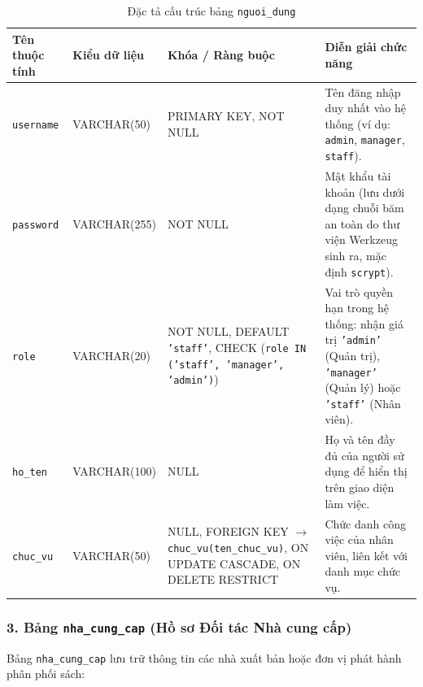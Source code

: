 \documentclass[12pt,a4paper]{article}
\begin{document}
\begin{table}[H]
\centering
\small
\renewcommand{\arraystretch}{1.2}
\begin{tabularx}{\textwidth}{|>{\raggedright\arraybackslash}p{3.0cm}|>{\raggedright\arraybackslash}p{2.6cm}|>{\raggedright\arraybackslash}p{3.8cm}|>{\raggedright\arraybackslash}X|}
\hline
\textbf{Tên thuộc tính} & \textbf{Kiểu dữ liệu} & \textbf{Khóa / Ràng buộc} & \textbf{Diễn giải chức năng} \\
\hline
\texttt{username} & VARCHAR(50) & PRIMARY KEY, NOT NULL & Tên đăng nhập duy nhất vào hệ thống (ví dụ: \texttt{admin}, \texttt{manager}, \texttt{staff}). \\
\hline
\texttt{password} & VARCHAR(255) & NOT NULL & Mật khẩu tài khoản (lưu dưới dạng chuỗi băm an toàn do thư viện Werkzeug sinh ra, mặc định \texttt{scrypt}). \\
\hline
\texttt{role} & VARCHAR(20) & NOT NULL, DEFAULT \texttt{'staff'}, CHECK (\texttt{role IN ('staff', 'manager', 'admin')}) & Vai trò quyền hạn trong hệ thống: nhận giá trị \texttt{'admin'} (Quản trị), \texttt{'manager'} (Quản lý) hoặc \texttt{'staff'} (Nhân viên). \\
\hline
\texttt{ho\_ten} & VARCHAR(100) & NULL & Họ và tên đầy đủ của người sử dụng để hiển thị trên giao diện làm việc. \\
\hline
\texttt{chuc\_vu} & VARCHAR(50) & NULL, FOREIGN KEY $\rightarrow$ \texttt{chuc\_vu(ten\_chuc\_vu)}, ON UPDATE CASCADE, ON DELETE RESTRICT & Chức danh công việc của nhân viên, liên kết với danh mục chức vụ. \\
\hline
\end{tabularx}
\caption{Đặc tả cấu trúc bảng \texttt{nguoi\_dung}}
\label{tab:csdl-nguoidung}
\end{table}

\subsubsection*{3. Bảng \texttt{nha\_cung\_cap} (Hồ sơ Đối tác Nhà cung cấp)}
Bảng \texttt{nha\_cung\_cap} lưu trữ thông tin các nhà xuất bản hoặc đơn vị phát hành phân phối sách:
\end{document}
